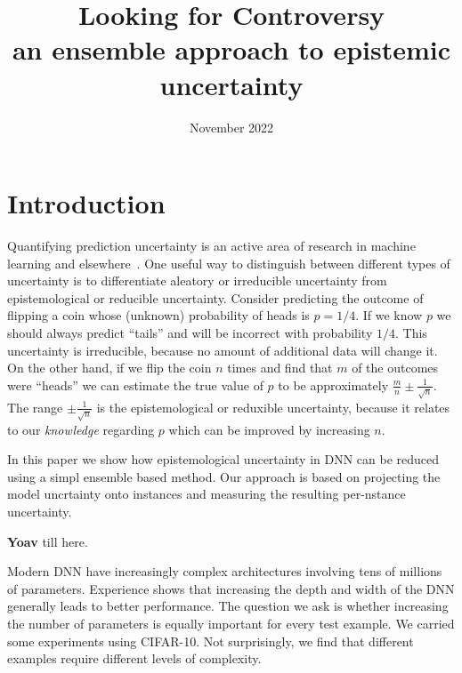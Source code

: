 \documentclass{article}
\title{Looking for Controversy\\ {\large an ensemble approach to epistemic uncertainty} }
\author{}
\date{November 2022}
\begin{document}
\maketitle

\section{Introduction}

Quantifying prediction uncertainty is an active area of research in
machine learning and
elsewhere~\cite{hora1996aleatory,der2009aleatory,hullermeier2019aleatoric}. One
useful way to distinguish between different types of uncertainty is to
differentiate aleatory or irreducible uncertainty from epistemological
or reducible uncertainty. Consider predicting the outcome of flipping
a coin whose (unknown) probability of heads is $p=1/4$. If we know $p$
we should always predict ``tails'' and will be incorrect with
probability $1/4$. This uncertainty is irreducible, because no amount
of additional data will change it. On the other hand, if we flip the
coin $n$ times and find that $m$ of the outcomes were ``heads'' we can
estimate the true value of $p$ to be approximately
$\frac{m}{n} \pm \frac{1}{\sqrt{n}}$. The range
$\pm \frac{1}{\sqrt{n}}$ is the epistemological or reduxible
uncertainty, because it relates to our {\em knowledge} regarding $p$
which can be improved by increasing $n$.

In this paper we show how epistemological uncertainty in DNN can be reduced using a simpl ensemble based method. Our approach is based on projecting the model uncrtainty onto instances and measuring the resulting per-nstance uncertainty.

{\bf Yoav} till here.

Modern DNN have increasingly complex architectures involving tens of millions of parameters. Experience shows that increasing the depth and width of the DNN generally leads to better performance. The question we ask is whether increasing the number of parameters is equally important for every test example. We carried some experiments using CIFAR-10. Not surprisingly, we find that different examples require different levels of complexity. 
\end{document}
